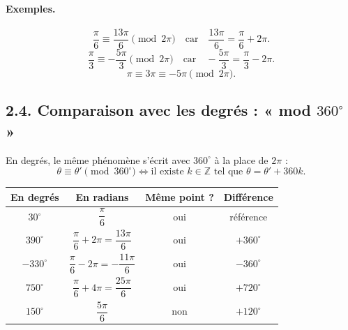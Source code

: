 \documentclass[11pt,a4paper]{article}
\begin{document}
\paragraph{Exemples.}
\[
\dfrac{\pi}{6}\equiv \dfrac{13\pi}{6}\pmod{2\pi}
\quad\text{car}\quad
\dfrac{13\pi}{6}=\dfrac{\pi}{6}+2\pi.
\]
\[
\dfrac{\pi}{3}\equiv -\dfrac{5\pi}{3}\pmod{2\pi}
\quad\text{car}\quad
-\dfrac{5\pi}{3}=\dfrac{\pi}{3}-2\pi.
\]
\[
\pi\equiv 3\pi\equiv -5\pi \pmod{2\pi}.
\]

\subsection*{2.4. Comparaison avec les degrés : « mod $360^\circ$ »}

En degrés, le même phénomène s'écrit avec $360^\circ$ à la place de $2\pi$ :
\[
\theta \equiv \theta' \pmod{360^\circ}
\iff
\text{il existe } k\in\mathbb{Z} \text{ tel que } \theta=\theta'+360k.
\]

\begin{center}
\begin{tabular}{|c|c|c|c|}
\hline
\textbf{En degrés} & \textbf{En radians} & \textbf{Même point ?} & \textbf{Différence}\\
\hline
$30^\circ$ & $\dfrac{\pi}{6}$ & oui & référence\\
\hline
$390^\circ$ & $\dfrac{\pi}{6}+2\pi=\dfrac{13\pi}{6}$ & oui & $+360^\circ$\\
\hline
$-330^\circ$ & $\dfrac{\pi}{6}-2\pi=-\dfrac{11\pi}{6}$ & oui & $-360^\circ$\\
\hline
$750^\circ$ & $\dfrac{\pi}{6}+4\pi=\dfrac{25\pi}{6}$ & oui & $+720^\circ$\\
\hline
$150^\circ$ & $\dfrac{5\pi}{6}$ & non & $+120^\circ$\\
\hline
\end{tabular}
\end{center}

\begin{center}
\end{center}
\end{document}
